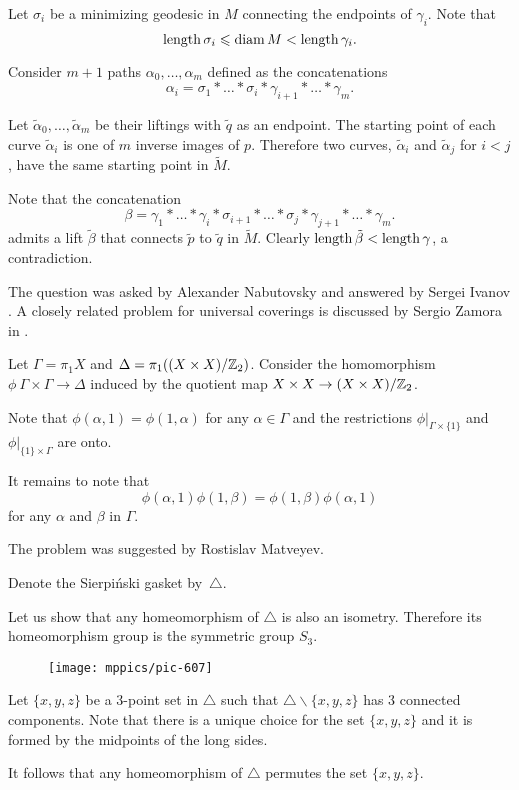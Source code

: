 Let $\sigma_i$ be a minimizing geodesic in $M$ connecting the endpoints of $\gamma_i$. 
Note that 
\[\operatorname{\rm length}\sigma_i\leqslant \operatorname{\rm diam}\nolimits M< \operatorname{\rm length}\gamma_i.\] 

Consider $m+1$ paths $\alpha_0,\dots,\alpha_m$ defined as the concatenations 
\[\alpha_i=\sigma_1{*}\dots{*}\sigma_i{*}\gamma_{i+1}{*}\dots{*}\gamma_m.\]

Let $\tilde\alpha_0,\dots,\tilde\alpha_m$ be their liftings
with $\tilde q$ as an endpoint.
The starting point of each curve $\tilde\alpha_i$ is one of $m$ inverse images of $p$. 
Therefore two curves, $\tilde\alpha_i$ and $\tilde\alpha_j$ for $i<j$, 
have the same starting point in $\tilde M$.

Note that the concatenation
\[\beta=\gamma_1{*}\dots{*}\gamma_i{*}\sigma_{i+1}{*}\dots{*}\sigma_j{*}\gamma_{j+1}{*}\dots{*}\gamma_m.\]
admits a lift $\tilde\beta$ that connects $\tilde p$ to $\tilde q$ in $\tilde M$.
Clearly $\operatorname{\rm length} \tilde\beta<\operatorname{\rm length} \gamma$, a contradiction.
\qeds

The question was asked by Alexander  Nabutovsky
and answered by Sergei Ivanov \cite{ivanov}.
A closely related problem for universal coverings is discussed by Sergio Zamora in \cite{zamora}.



Let $\Gamma=\pi_1 X$ and $\Delta=\pi_1((X\times X)/\mathbb{Z}_2)$.
Consider the homomorphism $\phi\:\Gamma\times \Gamma\to \Delta$
induced by the quotient map $X\times X\z\to (X\times X)/\ZZ_2$.

Note that $\phi(\alpha,1)=\phi(1,\alpha)$ for any $\alpha\in \Gamma$ and the restrictions $\phi|_{\Gamma\times \{1\}}$ and $\phi|_{\{1\}\times\Gamma}$
are onto.

It remains to note that 
$$\phi(\alpha,1)\phi(1,\beta)=\phi(1,\beta)\phi(\alpha,1)$$
for any $\alpha$ and $\beta$ in $\Gamma$.
\qeds

 
The problem was suggested by Rostislav Matveyev.




Denote the Sierpi\'nski gasket by~$\triangle$.

Let us show that any homeomorphism of $\triangle$ is also an isometry.
Therefore its homeomorphism group is the symmetric group $S_3$. 

{

\begin{wrapfigure}{r}{23 mm}
\vskip-4mm
\centering
\texttt{[image: mppics/pic-607]}
\end{wrapfigure}
Let $\{x,y,z\}$ be a 3-point set in $\triangle$ such that $\triangle \backslash\{x,y,z\}$ has 3 connected components.
Note that there is a unique choice for the set $\{x,y,z\}$ and 
it is formed by the midpoints of the long sides.

It follows that any homeomorphism of $\triangle$ permutes the set $\{x,y,z\}$.

}

